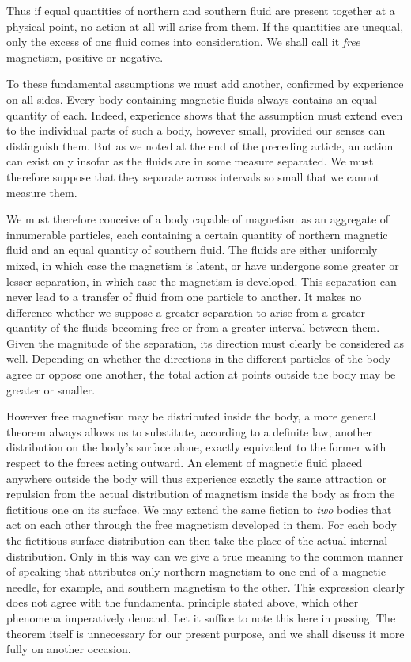 Thus if equal quantities of northern and southern fluid are present together at a physical point, no action at all will arise from them. If the quantities are unequal, only the excess of one fluid comes into consideration. We shall call it \textit{free} magnetism, positive or negative.

To these fundamental assumptions we must add another, confirmed by experience on all sides. Every body containing magnetic fluids always contains an equal quantity of each. Indeed, experience shows that the assumption must extend even to the individual parts of such a body, however small, provided our senses can distinguish them. But as we noted at the end of the preceding article, an action can exist only insofar as the fluids are in some measure separated. We must therefore suppose that they separate across intervals so small that we cannot measure them.

We must therefore conceive of a body capable of magnetism as an aggregate of innumerable particles, each containing a certain quantity of northern magnetic fluid and an equal quantity of southern fluid. The fluids are either uniformly mixed, in which case the magnetism is latent, or have undergone some greater or lesser separation, in which case the magnetism is developed. This separation can never lead to a transfer of fluid from one particle to another. It makes no difference whether we suppose a greater separation to arise from a greater quantity of the fluids becoming free or from a greater interval between them. Given the magnitude of the separation, its direction must clearly be considered as well. Depending on whether the directions in the different particles of the body agree or oppose one another, the total action at points outside the body may be greater or smaller.

However free magnetism may be distributed inside the body, a more general theorem always allows us to substitute, according to a definite law, another distribution on the body's surface alone, exactly equivalent to the former with respect to the forces acting outward. An element of magnetic fluid placed anywhere outside the body will thus experience exactly the same attraction or repulsion from the actual distribution of magnetism inside the body as from the fictitious one on its surface. We may extend the same fiction to \textit{two} bodies that act on each other through the free magnetism developed in them. For each body the fictitious surface distribution can then take the place of the actual internal distribution. Only in this way can we give a true meaning to the common manner of speaking that attributes only northern magnetism to one end of a magnetic needle, for example, and southern magnetism to the other. This expression clearly does not agree with the fundamental principle stated above, which other phenomena imperatively demand. Let it suffice to note this here in passing. The theorem itself is unnecessary for our present purpose, and we shall discuss it more fully on another occasion.

